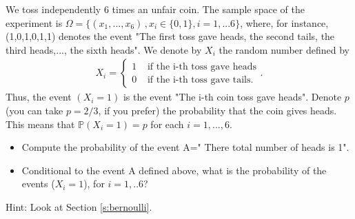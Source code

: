 \documentclass[12pt]{article}
\newcommand{\<}{{\langle \!\! \langle}}
\renewcommand{\>}{{\rangle \!\! \rangle}}
\newcommand{\bel}[2]{\begin{equation} \label{#1} \begin{split} #2
 					\end{split} \end{equation}}
\begin{document}
\begin{ExerciseList}
	\Exercise We toss independently 6 times an unfair coin. The sample space of the experiment is $\Omega=\{(x_1,...,x_6)\,, x_i\in\{0,1\}, i=1,...6\}$, where, for instance, (1,0,1,0,1,1) denotes the event "The first toss gave heads, the second tails, the third heads,..., the sixth heads". We denote by $X_i$ the random number defined by 
\bel{}{X_i=\begin{cases}
 1 & \textrm{ if the i-th toss gave heads}\\
 0 & \textrm{ if the i-th toss gave tails}.
\end{cases}.}
Thus, the event $(X_i=1)$ is the event "The i-th coin toss gave heads". 
Denote $p$ (you can take $p=2/3$, if you prefer) the probability that the coin gives heads. This means that $\mathbb{P}(X_i=1)=p$ for each $i=1,...,6$.
\begin{itemize}
    \item Compute the probability of the event A=" There total number of heads is 1".  
    \item Conditional to the event A defined above, what is the probability of the events 
    ($X_i=1$), for $i=1,..6$? 
\end{itemize}
Hint: Look at Section \ref{s:bernoulli}.
	

\end{ExerciseList}
\end{document}
